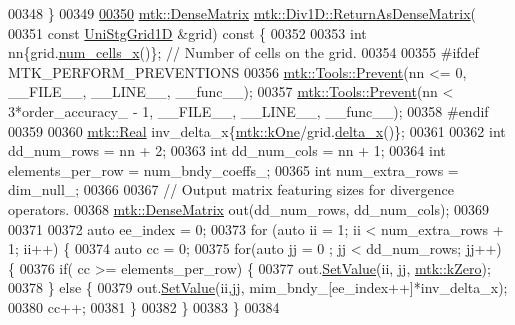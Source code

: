 \begin{DoxyCode}
{{00348 \}
00349 
\hypertarget{mtk__div__1d_8cc_source_l00350}{}\hyperlink{classmtk_1_1Div1D_a213fddbaaf86e4840c6a9649b69c2d49}{00350} \hyperlink{classmtk_1_1DenseMatrix}{mtk::DenseMatrix} \hyperlink{classmtk_1_1Div1D_a213fddbaaf86e4840c6a9649b69c2d49}{mtk::Div1D::ReturnAsDenseMatrix}(
00351   \textcolor{keyword}{const} \hyperlink{classmtk_1_1UniStgGrid1D}{UniStgGrid1D} &grid)\textcolor{keyword}{ const }\{
00352 
00353   \textcolor{keywordtype}{int} nn\{grid.\hyperlink{classmtk_1_1UniStgGrid1D_af1b3729d8afa07be5b2775ed68015b80}{num\_cells\_x}()\}; \textcolor{comment}{// Number of cells on the grid.}
00354 
00355 \textcolor{preprocessor}{  #ifdef MTK\_PERFORM\_PREVENTIONS}
00356   \hyperlink{classmtk_1_1Tools_a332324c6f25e66be9dff48c5987a3b9f}{mtk::Tools::Prevent}(nn <= 0, \_\_FILE\_\_, \_\_LINE\_\_, \_\_func\_\_);
00357   \hyperlink{classmtk_1_1Tools_a332324c6f25e66be9dff48c5987a3b9f}{mtk::Tools::Prevent}(nn < 3*order\_accuracy\_ - 1, \_\_FILE\_\_, \_\_LINE\_\_, \_\_func\_\_);
00358 \textcolor{preprocessor}{  #endif}
00359 
00360   \hyperlink{group__c01-roots_gac080bbbf5cbb5502c9f00405f894857d}{mtk::Real} inv\_delta\_x\{\hyperlink{group__c01-roots_ga26407c24d43b6b95480943340d285c71}{mtk::kOne}/grid.\hyperlink{classmtk_1_1UniStgGrid1D_a6e7173b01241632cf509496d66b9f74c}{delta\_x}()\};
00361 
00362   \textcolor{keywordtype}{int} dd\_num\_rows = nn + 2;
00363   \textcolor{keywordtype}{int} dd\_num\_cols = nn + 1;
00364   \textcolor{keywordtype}{int} elements\_per\_row = num\_bndy\_coeffs\_;
00365   \textcolor{keywordtype}{int} num\_extra\_rows = dim\_null\_;
00366 
00367   \textcolor{comment}{// Output matrix featuring sizes for divergence operators.}
00368   \hyperlink{classmtk_1_1DenseMatrix}{mtk::DenseMatrix} out(dd\_num\_rows, dd\_num\_cols);
00369 
00371 
00372   \textcolor{keyword}{auto} ee\_index = 0;
00373   \textcolor{keywordflow}{for} (\textcolor{keyword}{auto} ii = 1; ii < num\_extra\_rows + 1; ii++) \{
00374     \textcolor{keyword}{auto} cc = 0;
00375     \textcolor{keywordflow}{for}(\textcolor{keyword}{auto} jj = 0 ; jj < dd\_num\_rows; jj++) \{
00376       \textcolor{keywordflow}{if}( cc >= elements\_per\_row) \{
00377         out.\hyperlink{classmtk_1_1DenseMatrix_a784ce5784109ac86bfb9d8562b334b13}{SetValue}(ii, jj, \hyperlink{group__c01-roots_ga59a451a5fae30d59649bcda274fea271}{mtk::kZero});
00378       \} \textcolor{keywordflow}{else} \{
00379         out.\hyperlink{classmtk_1_1DenseMatrix_a784ce5784109ac86bfb9d8562b334b13}{SetValue}(ii,jj, mim\_bndy\_[ee\_index++]*inv\_delta\_x);
00380         cc++;
00381       \}
00382     \}
00383   \}
00384 
}}
\end{DoxyCode}

